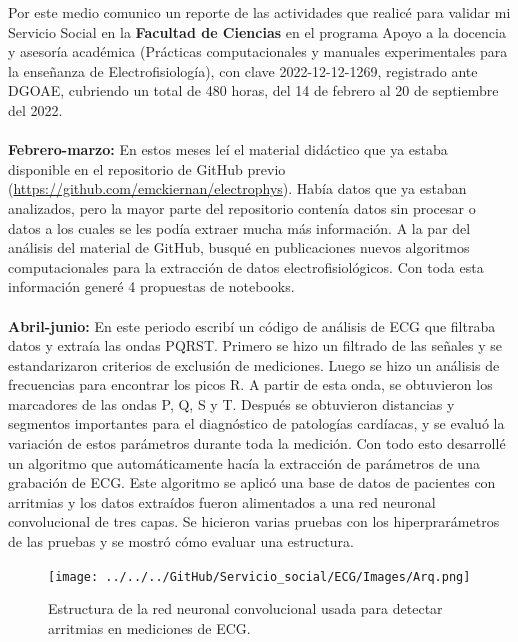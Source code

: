 \documentclass[11pt,letterpaper]{article}
\begin{document}
\begin{flushleft}
\hspace{2cm} Por este medio comunico un reporte de las actividades que realicé para validar mi Servicio Social en la \textbf{Facultad de Ciencias} en el programa Apoyo a la docencia y asesoría académica (Prácticas computacionales y manuales experimentales para la enseñanza de  Electrofisiología), con clave 2022-12-12-1269, registrado ante DGOAE, cubriendo un total de 480 horas, del 14 de febrero al 20 de septiembre del 2022.\\
\hfill \\
\textbf{Febrero-marzo:} En estos meses leí el material didáctico que ya estaba disponible en el repositorio de GitHub previo (\href{https://github.com/emckiernan/electrophys}{https://github.com/emckiernan/electrophys}). Había datos que ya estaban analizados, pero la mayor parte del repositorio contenía datos sin procesar o datos a los cuales se les podía extraer mucha más información. A la par del análisis del material de GitHub, busqué en publicaciones nuevos algoritmos computacionales para la extracción de datos electrofisiológicos. Con toda esta información generé 4 propuestas de notebooks.  \\
\hfill \\
\textbf{Abril-junio:} En este periodo escribí un código de análisis de ECG que filtraba datos y extraía las ondas PQRST. Primero se hizo un filtrado de las señales y se estandarizaron criterios de exclusión de mediciones. Luego se hizo un análisis de frecuencias para encontrar los picos R. A partir de esta onda, se obtuvieron los marcadores de las ondas P, Q, S y T. Después se obtuvieron distancias y segmentos importantes para el diagnóstico de patologías cardíacas, y se evaluó la variación de estos parámetros durante toda la medición. Con todo esto desarrollé un algoritmo que automáticamente hacía la extracción de parámetros de una grabación de ECG.  Este algoritmo se aplicó una base de datos de pacientes con arritmias y los datos extraídos fueron alimentados a una red neuronal convolucional de tres capas. Se hicieron varias pruebas con los hiperprarámetros de las pruebas y se mostró cómo evaluar una estructura.  \\
\begin{figure}[H]
\centering
\begin{minipage}{.48\linewidth}
\texttt{[image: ../../../GitHub/Servicio\_social/ECG/Images/Arq.png]} 
\caption{\footnotesize{Estructura de la red neuronal convolucional usada para detectar arritmias en mediciones de ECG.}}

\end{minipage}
\end{figure}
\end{flushleft}
\end{document}

